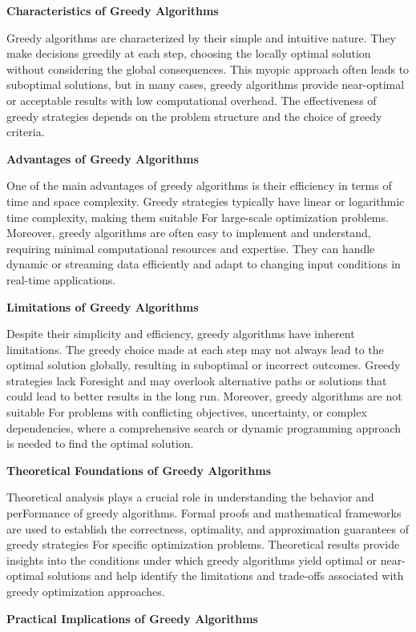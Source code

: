\documentclass[12pt]{book} %
\begin{document}
\textbf{Characteristics of Greedy Algorithms}

Greedy algorithms are characterized by their simple and intuitive nature. They make decisions greedily at each step, choosing the locally optimal solution without considering the global consequences. This myopic approach often leads to suboptimal solutions, but in many cases, greedy algorithms provide near-optimal or acceptable results with low computational overhead. The effectiveness of greedy strategies depends on the problem structure and the choice of greedy criteria.

\textbf{Advantages of Greedy Algorithms}

One of the main advantages of greedy algorithms is their efficiency in terms of time and space complexity. Greedy strategies typically have linear or logarithmic time complexity, making them suitable For large-scale optimization problems. Moreover, greedy algorithms are often easy to implement and understand, requiring minimal computational resources and expertise. They can handle dynamic or streaming data efficiently and adapt to changing input conditions in real-time applications.

\textbf{Limitations of Greedy Algorithms}

Despite their simplicity and efficiency, greedy algorithms have inherent limitations. The greedy choice made at each step may not always lead to the optimal solution globally, resulting in suboptimal or incorrect outcomes. Greedy strategies lack Foresight and may overlook alternative paths or solutions that could lead to better results in the long run. Moreover, greedy algorithms are not suitable For problems with conflicting objectives, uncertainty, or complex dependencies, where a comprehensive search or dynamic programming approach is needed to find the optimal solution.

\textbf{Theoretical Foundations of Greedy Algorithms}

Theoretical analysis plays a crucial role in understanding the behavior and perFormance of greedy algorithms. Formal proofs and mathematical frameworks are used to establish the correctness, optimality, and approximation guarantees of greedy strategies For specific optimization problems. Theoretical results provide insights into the conditions under which greedy algorithms yield optimal or near-optimal solutions and help identify the limitations and trade-offs associated with greedy optimization approaches.

\textbf{Practical Implications of Greedy Algorithms}
\end{document}

